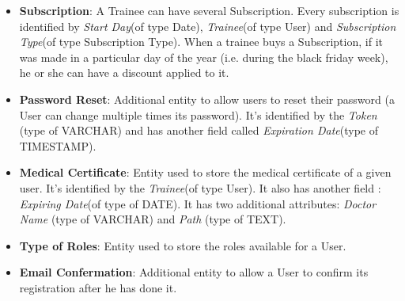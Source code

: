 \begin{itemize}
    	\item \textbf{Subscription}: A Trainee can have several Subscription. Every subscription is identified by \textit{Start Day}(of type Date), \textit{Trainee}(of type User) and \textit{Subscription Type}(of type Subscription Type). When a trainee buys a Subscription, if it was made in a particular day of the year (i.e. during the black friday week), he or she can have a discount applied to it.
    	
    	\item \textbf{Password Reset}: Additional entity to allow users to reset their password (a User can change multiple times its password). It's identified by the \textit{Token} (type of VARCHAR) and has another field called \textit{Expiration Date}(type of TIMESTAMP).
        
        \item \textbf{Medical Certificate}: Entity used to store the medical certificate of a given user. It's identified by the \textit{Trainee}(of type User). It also has another field : \textit{Expiring Date}(of type of DATE). It has two additional attributes: \textit{Doctor Name} (type of VARCHAR) and \textit{Path} (type of TEXT).
        
        \item \textbf{Type of Roles}: Entity used to store the roles available for a User.
        
        \item \textbf{Email Confermation}: Additional entity to allow a User to confirm its registration after he has done it.
	
    \end{itemize}